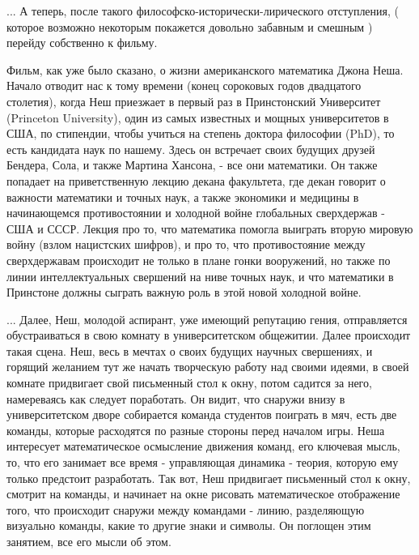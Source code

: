 ... А теперь, после такого философско-исторически-лирического отступления, (
которое возможно некоторым покажется довольно забавным и смешным ) перейду
собственно к фильму.

Фильм, как уже было сказано, о жизни американского математика Джона Неша.
Начало отводит нас к тому времени (конец сороковых годов двадцатого столетия),
когда Неш приезжает в первый раз в Принстонский Университет (Princeton
University), один из самых известных и мощных университетов в США, по
стипендии, чтобы учиться на степень доктора философии (PhD), то есть кандидата
наук по нашему.  Здесь он встречает своих будущих друзей Бендера, Сола, и также
Мартина Хансона, - все они математики. Он также попадает на приветственную
лекцию декана факультета, где декан говорит о важности математики и точных
наук, а также экономики и медицины в начинающемся противостоянии и холодной
войне глобальных сверхдержав - США и СССР.  Лекция про то, что математика
помогла выиграть вторую мировую войну (взлом нацистских шифров), и про то, что
противостояние между сверхдержавам происходит не только в плане гонки
вооружений, но также по линии интеллектуальных свершений на ниве точных наук, и
что математики в Принстоне должны сыграть важную роль в этой новой холодной
войне. 

... Далее, Неш, молодой аспирант, уже имеющий репутацию гения, отправляется
обустраиваться в свою комнату в университетском общежитии. Далее происходит
такая сцена. Неш, весь в мечтах о своих будущих научных свершениях, и горящий
желанием тут же начать творческую работу над своими идеями, в своей комнате
придвигает свой письменный стол к окну, потом садится за него, намереваясь как
следует поработать.  Он видит, что снаружи внизу в университетском дворе
собирается команда студентов поиграть в мяч, есть две команды, которые
расходятся по разные стороны перед началом игры. Неша интересует математическое
осмысление движения команд, его ключевая мысль, то, что его занимает все время
- управляющая динамика - теория, которую ему только предстоит разработать.  Так
вот, Неш придвигает письменный стол к окну, смотрит на команды, и начинает на
окне рисовать математическое отображение того, что происходит снаружи между
командами - линию, разделяющую визуально команды, какие то другие знаки и
символы.  Он поглощен этим занятием, все его мысли об этом. 



